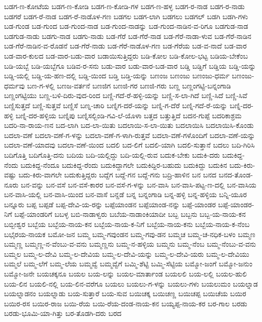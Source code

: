 ಬಡಗ-ಣ-ಕೋಟೆಯ
ಬಡಗ-ಣ-ಕೋಡಿ
ಬಡಗ-ಣ-ಕೋಡಿ-ಗಳ
ಬಡಗ-ಣ-ಹಳ್ಳ
ಬಡಗ-ರ-ನಾಡ
ಬಡಗ-ರ-ನಾಡು
ಬಡಗರೆ
ಬಡಗ-ರೆ-ನಾಡ
ಬಡಗ-ರೆ-ನಾಡೊಳ-ಗಣ
ಬಡಗಲ
ಬಡಗ-ಲಾಗಿ
ಬಡಗಲು
ಬಡಗಲ್
ಬಡಗಿ
ಬಡಗಿ-ಗಳು
ಬಡ-ಗುಂಡ
ಬಡ-ಗುಂದ
ಬಡ-ಗುಂದ-ನಾಡ
ಬಡ-ಗುಂದ-ನಾಡನ್ನು
ಬಡ-ಗುಂದ-ನಾಡಿನ-ವ-ರಿಗೂ
ಬಡಗುಡ-ನಾಡ
ಬಡಗುಡ-ನಾಡು
ಬಡಗು-ನಾಡ
ಬಡಗು-ನಾಡು
ಬಡ-ಗೆರೆ
ಬಡ-ಗೆರೆ-ನಾಡ
ಬಡ-ಗೆರೆ-ನಾಡಾ-ಳುವ
ಬಡ-ಗೆರೆ-ನಾಡಿನ
ಬಡ-ಗೆರೆ-ನಾಡಿನ-ವ-ರೊಡನೆ
ಬಡ-ಗೆರೆ-ನಾಡು
ಬಡ-ಗೆರೆ-ನಾಡೊಳ-ಗಣ
ಬಡ-ಗೆರೆಯ
ಬಡ-ವ-ನಾದೆ
ಬಡ-ವಾರ
ಬಡ-ವಾರ-ಕುಲದ
ಬಡ-ವಾರ-ಬಡು-ವಾರ
ಬಡಾಯಿಸುತ್ತಿದ್ದರು
ಬಡಿ-ಕೋಲ
ಬಡಿ-ಕೋಲ-ಭಟ್ಟ
ಬಡಿಯ-ಬೇಕೆಂಬ
ಬಡಿ-ಯಬ್ಬೆ
ಬಡಿ-ಯಬ್ಬೆಗೂ
ಬಡಿವ-ರ-ಸನು
ಬಡು-ವಾರ
ಬಡು-ವಾರ-ಬಡ-ವಾರ
ಬಡ್ಡಿ
ಬಡ್ಡಿಗೆ
ಬಡ್ಡಿಯ
ಬಡ್ಡಿ-ಯನ್ನು
ಬಡ್ಡಿ-ಯಲ್ಲಿ
ಬಡ್ಡಿ-ಯ-ಹಣ-ದಲ್ಲಿ
ಬಡ್ಡಿ-ಯಿಂದ
ಬಡ್ತಿ
ಬಡ್ತಿ-ಯನ್ನು
ಬಣಂಜ
ಬಣಂಜು
ಬಣಂಜು-ಧರ್ಮ
ಬಣಂಜು-ಧರ್ಮವು
ಬಣ-ಗ-ಳಲ್ಲಿ
ಬಣಜ-ವರ್ತನೆ
ಬಣಜಿಗ
ಬಣಜಿ-ಗರ
ಬಣಜಿ-ಗರು
ಬಣ್ಣ
ಬಣ್ಣಂಗಟ್ಟಿ-ಬನ್ನಂಗಾಡಿ
ಬಣ್ಣಂಗಟ್ಟಿಯು
ಬಣ್ಣ-ಬಳಿ-ದಿರು-ವುದ-ರಿಂದ
ಬಣ್ಣಿ-ಗದೆ-ರೆ-ಹಳ್ಳಿ-ಯನ್ನು
ಬಣ್ಣಿ-ಸ-ಲಾ-ಗಿದೆ
ಬಣ್ಣಿ-ಸಿದೆ
ಬಣ್ಣಿ-ಸಿವೆ
ಬಣ್ಣಿಸುತ್ತದೆ
ಬಣ್ಣಿ-ಸುತ್ತವೆ
ಬಣ್ಣಿಸೆ
ಬಣ್ನ-ಚಾರಿ
ಬಣ್ನಿಗ-ದರೆ-ಯನ್ನು
ಬಣ್ನಿ-ಗ-ದೆರೆ
ಬಣ್ನಿ-ಗದೆ-ರೆ-ಯನ್ನು
ಬಣ್ನಿ-ದರ-ಹಳ್ಳಿ
ಬಣ್ನಿ-ದರ-ಹಳ್ಳಿಯ
ಬಣ್ನಿಪು
ಬಣ್ನಿಸಲ್ಬಿಂಡಿ-ಗವಿ-ಲೆ-ಯೊಳಾ
ಬತ್ತದ
ಬತ್ತುತ್ತಿದೆ
ಬದನ-ಗುಪ್ಪೆ
ಬದರಿಕಾಶ್ರಮ
ಬದರಿ-ನಾ-ರಾಯ-ಣನ
ಬದ-ಲಾಗಿ
ಬದ-ಲಾ-ಯಿತು
ಬದಲಾಯಿ-ಸ-ಲಾ-ಯಿತು
ಬದಲಾಯಿಸಿ
ಬದಲಾಯಿಸಿ-ಕೊಂಡು
ಬದಲಾ-ವಣೆ
ಬದಲಾ-ವಣೆ-ಗ-ಳನ್ನು
ಬದಲಾ-ವಣೆ-ಗ-ಳಾಗಿ-ರುತ್ತವೆ
ಬದಲಾ-ವಣೆ-ಗಳೊಂದಿಗೆ
ಬದಲಾ-ವಣೆ-ಯನ್ನು
ಬದಲಾ-ವಣೆ-ಯಾದವು
ಬದಲಾ-ವಣೆ-ಯಿಂದ
ಬದಲಿ
ಬದ-ಲಿಗೆ
ಬದಲಿ-ಯಾಗಿ
ಬದಲಿ-ಸುತ್ತಾನೆ
ಬದಲು
ಬದಿ-ಗಿರಿಸಿ
ಬದಿಗೊತ್ತಿ
ಬದಿಗೊತ್ತಿ-ದನು
ಬದಿಯ
ಬದಿ-ಯಲ್ಲಿದ್ದು
ಬದಿ-ಯಲ್ಲಿ-ರುವ
ಬದುಕ-ಬೇಕು
ಬದುಕಿ-ದರು
ಬದುಕಿದ್ದ-ನೆಂದು
ಬದುಕಿದ್ದ-ನೆಂದೂ
ಬದುಕಿದ್ದ-ರೆಂದು
ಬದುಕಿದ್ದಾಗಲೇ
ಬದುಕಿದ್ದಿರ-ಬಹುದು
ಬದುಕಿದ್ದು
ಬದುಕಿನ
ಬದು-ಕಿರು-ವಷ್ಟು
ಬದು-ಕಿರು-ವಾಗಲೇ
ಬದುಕುತ್ತಿದ್ದರು
ಬದ್ದೆಗ
ಬದ್ದೆ-ಗನ
ಬದ್ದೆ-ಗನು
ಬದ್ರಿ-ಹಾಳಿನ
ಬನ
ಬನದ
ಬನದ-ತೊಂಡ-ನೂರು
ಬನ-ವನ್ನು
ಬನ-ವಸೆ
ಬನ-ವಸೆ-ಕಾರರ
ಬನ-ವಸೆ-ಗ-ಳನ್ನು
ಬನ-ವಾಸಿ
ಬನ-ವಾಸಿ-ಪಟ್ಟ-ಣ-ದಲ್ಲಿ
ಬನ-ವಾಸಿಯ
ಬನ-ವಾಸಿ-ಯಲ್ಲಿ
ಬನ-ವಾಸಿ-ಯಿಂದ
ಬನ-ವಾಸೆ
ಬನ್ದಡೆ
ಬನ್ನ
ಬನ್ನಂಗಾಡಿ
ಬನ್ನ-ಹಳ್ಳಿ
ಬನ್ನ-ಹಳ್ಳಿಯ
ಬನ್ನಿ-ಯೂರ
ಬನ್ನೂರು
ಬಪ್ಪ
ಬಪ್ಪಡೆ
ಬಪ್ಪ-ದೇವಿ-ಯ-ರನ್ನು
ಬಪ್ಪೆಯಾಂಡನ
ಬಪ್ಪೆಯಾಂಡ-ನನ್ನು
ಬಪ್ಪೆ-ಯಾಂಡರ
ಬಪ್ಪೆ-ಯಾಂಡರ-ನಿಗೆ
ಬಪ್ಪೆ-ಯಾಂಡರಿಗೆ
ಬಬಳ್ಳ
ಬಬಿ-ನಾಡಾಳ್ವರು
ಬಬೆಯ-ನಾಡಾಂಕಿಯಾದೀ
ಬಬ್ಬ
ಬಬ್ಬನು
ಬಬ್ಬ-ಯ-ನಾಯ-ಕನ
ಬಬ್ಬೀಶ್ವರ
ಬಬ್ಬೆಯ
ಬಬ್ಬೆಯ-ನಾಯ-ಕನ
ಬಬ್ಬೆಯ-ನಾಯ-ಕ-ನಿಗೆ
ಬಬ್ಬೆಯ-ನಾಯ-ಕನು
ಬಬ್ಬೆಯ-ನಾಯ-ಕ-ನೆಂಬ
ಬಭೈರಯ-ನಾಯಕ
ಬಮೋ-ಜನ
ಬಮ್ಮ
ಬಮ್ಮ-ಗವುಂಡನ
ಬಮ್ಮ-ಗವು-ಡನ
ಬಮ್ಮಚ
ಬಮ್ಮ-ಚ-ನಧಿಕ-ಬಳಂ
ಬಮ್ಮಣ
ಬಮ್ಮಣ್ಣ
ಬಮ್ಮಣ್ಣ-ನ-ವೆಂಬು-ವ-ವನು
ಬಮ್ಮಣ್ಣನು
ಬಮ್ಮ-ನ-ಹಳ್ಳಿಯ
ಬಮ್ಮನು
ಬಮ್ಮ-ನೆಂಬ
ಬಮ್ಮ-ನೆಂಬು-ವ-ವನು
ಬಮ್ಮಲ
ಬಮ್ಮ-ಲ-ದೇವಿ
ಬಮ್ಮ-ಲ-ದೇವಿಯ
ಬಮ್ಮ-ಲ-ದೇವಿ-ಯನ್ನು
ಬಮ್ಮ-ಲ-ದೇವಿ-ಯರು
ಬಮ್ಮ-ಲ-ದೇವಿಯು
ಬಮ್ಮಲೆ
ಬಮ್ಮ-ಲೆಗೆ
ಬಮ್ಮ-ಲೆಯ
ಬಮ್ಮವ್ವೆ
ಬಮ್ಮವ್ವೆಗೆ
ಬಮ್ಮಿ-ಶೆಟ್ಟಿ
ಬಮ್ಮಿ-ಸೆಟ್ಟಿಯ
ಬಮ್ಮೋ-ಜಂಗೆ
ಬಮ್ಮೋ-ಜನುಂ
ಬಮ್ಮೋ-ಜನೇ
ಬಯಚಕ್ಕನೂ
ಬಯಲ
ಬಯ-ಲನ್ನು
ಬಯಲ-ಮಾರ್ತಾಂಡ
ಬಯಲಲಿ
ಬಯ-ಲಲ್ಲಿ
ಬಯಲ-ಹುಲಿ
ಬಯ-ಲಿನ
ಬಯಲಿ-ನಲ್ಲಿ
ಬಯ-ಲಿನ-ವರೆಗೂ
ಬಯಲು
ಬಯಲು-ಗ-ಳನ್ನು
ಬಯಲು-ಗಳು
ಬಯಲುಮಂ
ಬಯಲ್ನಾಡ
ಬಯಲ್ನಾಡನಂ
ಬಯಲ್ನಾಡು
ಬಯ-ಸುತ್ತಾರೆ
ಬಯ-ಸುವ
ಬಯಿಚಕ್ಕ
ಬಯಿಚಣ್ಣ
ಬಯಿಚಪ್ಪ
ಬಯಿಚೆಯ
ಬಯಿರ
ಬಯಿರ-ರಸ
ಬಯಿರ-ರಾಜ
ಬಯಿ-ರೆಯ
ಬಯಿ-ರೆಯ-ದಂಡ-ನಾಯ-ಕನ
ಬಯ್ಯಪ್ಪ-ನಾಯ-ಕರ
ಬರ-ಗಾಲ
ಬರಡು
ಬರಡು-ಭೂಮಿ-ಯಾ-ಗಿತ್ತು
ಬರ-ತೊಡಗಿ-ದರು
ಬರದ
